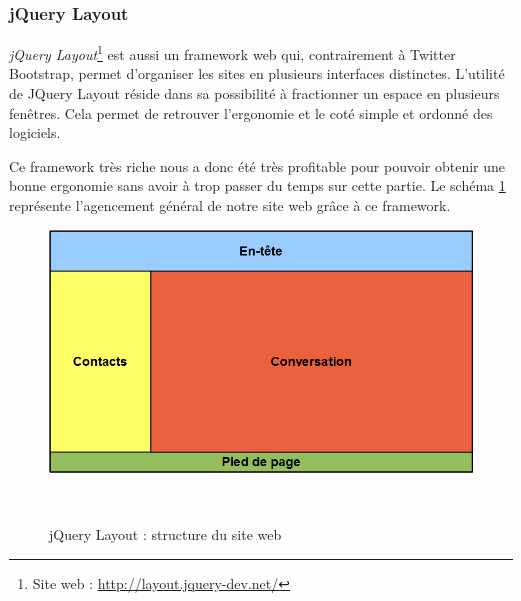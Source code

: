 \subsubsection{jQuery Layout}

\textit{jQuery Layout}\footnote{Site web : \href{http://layout.jquery-dev.net/}{http://layout.jquery-dev.net/}} est aussi un framework web qui, contrairement à Twitter Bootstrap, permet d'organiser les sites en plusieurs interfaces distinctes. 
L'utilité de JQuery Layout réside dans sa possibilité à fractionner un espace en plusieurs fenêtres.
Cela permet de retrouver l'ergonomie et le coté simple et ordonné des logiciels. 

Ce framework très riche nous a donc été très profitable pour pouvoir obtenir une bonne ergonomie sans avoir
à trop passer du temps sur cette partie.
Le schéma \ref{siteWeb_jQueryLayout} représente l'agencement général de notre site web grâce à ce framework.

\begin{figure}[!h]
	\center
	\includegraphics[width=13cm]{img/siteWeb_jQueryLayout.png}
	\caption{jQuery Layout : structure du site web}
	\label{siteWeb_jQueryLayout}
~~\\
\end{figure}

